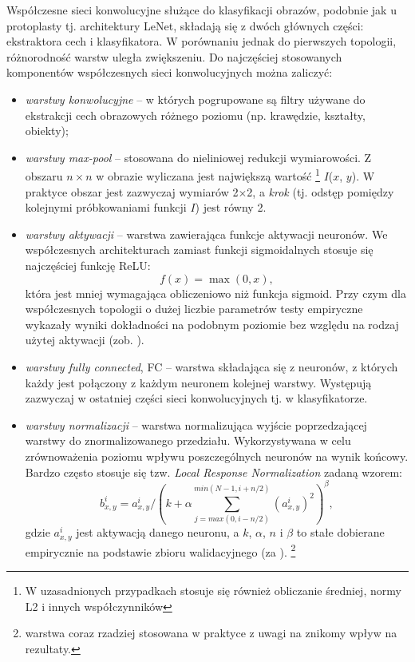 Współczesne sieci konwolucyjne służące do klasyfikacji obrazów, podobnie jak u protoplasty tj. architektury LeNet, składają się z dwóch głównych części: ekstraktora cech i klasyfikatora. W porównaniu jednak do pierwszych topologii, różnorodność warstw uległa zwiększeniu. Do najczęściej stosowanych komponentów współczesnych sieci konwolucyjnych można zaliczyć:
\begin{itemize}
	\item \textit{warstwy konwolucyjne} -- w których pogrupowane są filtry używane do ekstrakcji cech obrazowych różnego poziomu (np. krawędzie, kształty, obiekty);
	\item \textit{warstwy max-pool} -- stosowana do nieliniowej redukcji wymiarowości. Z obszaru $n\times$$n$ w obrazie wyliczana jest największą wartość \footnote{W uzasadnionych przypadkach stosuje się również obliczanie średniej, normy L2 i innych współczynników} $I$($x$, $y$). W praktyce obszar jest zazwyczaj wymiarów 2$\times$2, a \textit{krok} (tj. odstęp pomiędzy kolejnymi próbkowaniami funkcji $I$) jest równy 2.
	\item \textit{warstwy aktywacji} -- warstwa zawierająca funkcje aktywacji neuronów. We współczesnych architekturach zamiast funkcji sigmoidalnych stosuje się najczęściej funkcję ReLU:
	\begin{equation}
		f(x) = \max(0, x),
	\end{equation}
	która jest mniej wymagająca obliczeniowo niż funkcja sigmoid. Przy czym dla współczesnych topologii o dużej liczbie parametrów testy empiryczne wykazały wyniki dokładności na podobnym poziomie bez względu na rodzaj użytej aktywacji (zob. \cite{Krizhevsky2012}). 
	\item \textit{warstwy fully connected}, FC -- warstwa składająca się z neuronów, z których każdy jest połączony z każdym neuronem kolejnej warstwy. Występują zazwyczaj w ostatniej części sieci konwolucyjnych tj. w klasyfikatorze.
	\item \textit{warstwy normalizacji} -- warstwa normalizująca wyjście poprzedzającej warstwy do znormalizowanego przedziału. Wykorzystywana w celu zrównoważenia poziomu wpływu poszczególnych neuronów na wynik końcowy. Bardzo często stosuje się tzw. \textit{Local Response Normalization} zadaną wzorem:
	\begin{equation}
	\label{DLnormEquation}
	b_{x,y}^{i} = a_{x,y}^{i}/\left ( k + \alpha \sum_{j=max(0,i-n/2)}^{min(N-1,i+n/2)}(a_{x,y}^{i})^2 \right )^\beta,
	\end{equation}
	gdzie $a_{x,y}^{i}$ jest aktywacją danego neuronu, a $k$, $\alpha$, $n$ i $\beta$ to stałe dobierane empirycznie na podstawie zbioru walidacyjnego (za \cite{Krizhevsky2012}).
	\footnote{warstwa coraz rzadziej stosowana w praktyce z uwagi na znikomy wpływ na rezultaty.}
\end{itemize}

